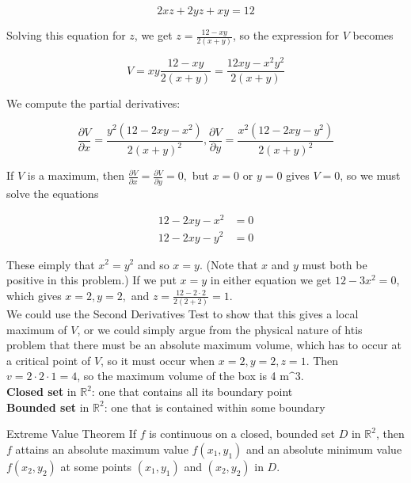         \[
            2xz + 2yz + xy = 12
        \]

        Solving this equation for $z$, we get $z = \frac{12 - xy}{2(x+y)}$, so the expression for $V$ becomes

        \[
            V = xy \frac{12-xy}{2(x+ y)} = \frac{12xy - x^2 y^2}{2(x+y)}
        \]

        We compute the partial derivatives:

        \[
            \frac{\partial V}{\partial x} = \frac{y^2 (12 - 2xy - x^2)}{2(x+y)^2}, \frac{\partial V}{\partial y} = \frac{x^2 (12 - 2xy - y^2)}{2(x+y)^2}
        \]

        If $V$ is a maximum, then $\frac{\partial V}{\partial x} = \frac{\partial V}{\partial y} = 0,$ but $x= 0$ or $y= 0$ gives $V= 0$, so we must solve the equations

        \begin{align*}
            12 - 2xy - x^2 &= 0 \\
            12 - 2xy - y^2 &= 0
        \end{align*}

        These eimply that $x^2 = y^2$ and so $x = y$. (Note that $x$ and $y$ must both be positive in this problem.) If we put $x=y$ in either equation we get $12 - 3x^2 = 0$, which gives $x=2, y=2, $ and
        $z = \frac{12 - 2\cdot 2}{2(2+2)} = 1$. \\

        We could use the Second Derivatives Test to show that this gives a local maximum of $V$, or we could simply argue from the physical nature of htis problem that there must be an absolute maximum volume, which has
        to occur at a critical point of $V$, so it must occur when $x=2, y=2, z=1$. Then $v=2\cdot 2 \cdot 1 = 4$, so the maximum volume of the box is 4 $\text{m^3}$. \\

        \textbf{Closed set} in $\mathbb{R}^2$: one that contains all its boundary point \\
        \textbf{Bounded set} in $\mathbb{R}^2$: one that is contained within some boundary

        \begin{theorem}{Extreme Value Theorem}
            If $f$ is continuous on a closed, bounded set $D$ in $\mathbb{R}^2$, then $f$ attains an absolute maximum value $f(x_1, y_1)$ and an absolute minimum value $f(x_2, y_2)$ at some points $(x_1, y_1)$ and
            $(x_2, y_2)$ in $D$.
        \end{theorem}

